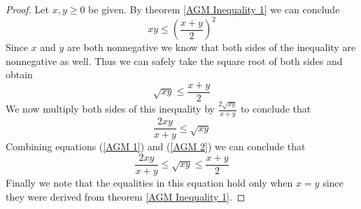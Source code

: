         \begin{proof}
            Let $x, y \ge 0$ be given. By theorem \ref{AGM Inequality 1} we can conclude
            \[
                xy \le \left(\frac{x + y}{2}\right)^2
            \]
            Since $x$ and $y$ are both nonnegative we know that both sides of the inequality
            are nonnegative as well. Thus we can safely take the square root of both sides
            and obtain
            \begin{equation}
                \label{AGM 1}
                \sqrt{xy} \le \frac{x + y}{2}
            \end{equation}
            We now multiply both sides of this inequality by $\frac{2\sqrt{xy}}{x + y}$ to
            conclude that
            \begin{equation}
                \label{AGM 2}
                \frac{2xy}{x + y} \le \sqrt{xy}
            \end{equation}
            Combining equations (\ref{AGM 1}) and (\ref{AGM 2}) we can conclude that
            \[
                \frac{2xy}{x + y} \le \sqrt{xy} \le \frac{x + y}{2}
            \]
            Finally we note that the equalities in this equation hold only when $x = y$
            since they were derived from theorem \ref{AGM Inequality 1}. \QED
        \end{proof}
